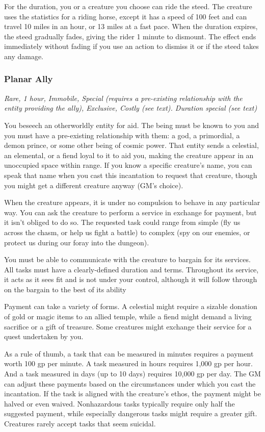 For the duration, you or a creature you choose can ride the steed. The creature uses the statistics for a riding horse, except it has a speed of 100 feet and can travel 10 miles in an hour, or 13 miles at a fast pace. When the duration expires, the steed gradually fades, giving the rider 1 minute to dismount. The effect ends immediately without fading if you use an action to dismiss it or if the steed takes any damage.

\subsubsection{Planar Ally}
\textit{Rare, 1 hour, Immobile, Special (requires a pre-existing relationship with the entity providing the ally), Exclusive, Costly (see text). Duration special (see text)}

You beseech an otherworldly entity for aid. The being must be known to you and you must have a pre-existing relationship with them: a god, a primordial, a demon prince, or some other being of cosmic power. That entity sends a celestial, an elemental, or a fiend loyal to it to aid you, making the creature appear in an unoccupied space within range. If you know a specific creature's name, you can speak that name when you cast this incantation to request that creature, though you might get a different creature anyway (GM's choice).

When the creature appears, it is under no compulsion to behave in any particular way. You can ask the creature to perform a service in exchange for payment, but it isn't obliged to do so. The requested task could range from simple (fly us across the chasm, or help us fight a battle) to complex (spy on our enemies, or protect us during our foray into the dungeon). 

You must be able to communicate with the creature to bargain for its services. All tasks must have a clearly-defined duration and terms. Throughout its service, it acts as it sees fit and is not under your control, although it will follow through on the bargain to the best of its ability

Payment can take a variety of forms. A celestial might require a sizable donation of gold or magic items to an allied temple, while a fiend might demand a living sacrifice or a gift of treasure. Some creatures might exchange their service for a quest undertaken by you.

As a rule of thumb, a task that can be measured in minutes requires a payment worth 100 gp per minute. A task measured in hours requires 1,000 gp per hour. And a task measured in days (up to 10 days) requires 10,000 gp per day. The GM can adjust these payments based on the circumstances under which you cast the incantation. If the task is aligned with the creature's ethos, the payment might be halved or even waived. Nonhazardous tasks typically require only half the suggested payment, while especially dangerous tasks might require a greater gift. Creatures rarely accept tasks that seem suicidal.

